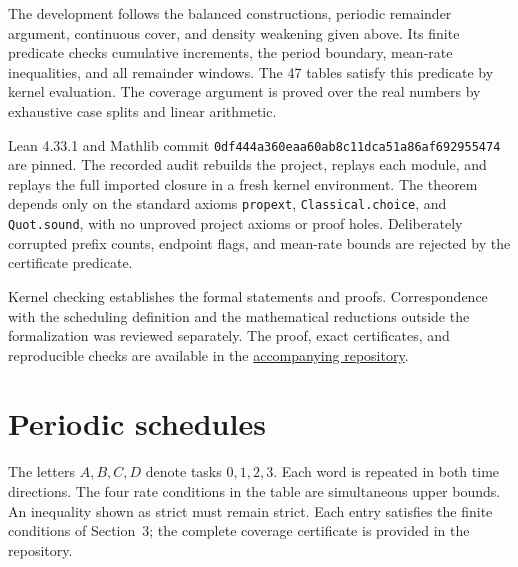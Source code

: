 \documentclass[11pt]{article}
\begin{document}
The development follows the balanced constructions, periodic remainder argument, continuous cover, and density weakening given above. Its finite predicate checks cumulative increments, the period boundary, mean-rate inequalities, and all remainder windows. The 47 tables satisfy this predicate by kernel evaluation. The coverage argument is proved over the real numbers by exhaustive case splits and linear arithmetic.

Lean 4.33.1 and Mathlib commit \texttt{0df444a360eaa60ab8c11dca51a86af692955474} are pinned. The recorded audit rebuilds the project, replays each module, and replays the full imported closure in a fresh kernel environment. The theorem depends only on the standard axioms \texttt{propext}, \texttt{Classical.choice}, and \texttt{Quot.sound}, with no unproved project axioms or proof holes. Deliberately corrupted prefix counts, endpoint flags, and mean-rate bounds are rejected by the certificate predicate.

Kernel checking establishes the formal statements and proofs. Correspondence with the scheduling definition and the mathematical reductions outside the formalization was reviewed separately. The proof, exact certificates, and reproducible checks are available in the \href{https://github.com/spaghettic0de/four-real-periods}{accompanying repository}.

\appendix
\section{Periodic schedules}\label{app:words}
The letters $A,B,C,D$ denote tasks $0,1,2,3$. Each word is repeated in both time directions. The four rate conditions in the table are simultaneous upper bounds. An inequality shown as strict must remain strict. Each entry satisfies the finite conditions of Section~3; the complete coverage certificate is provided in the repository.
\end{document}
